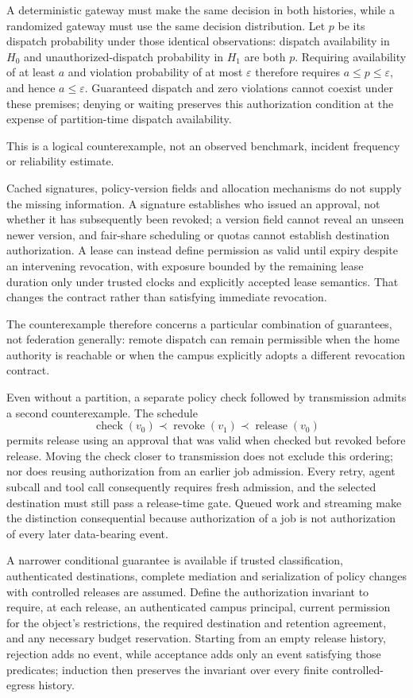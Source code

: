 \documentclass[11pt]{article}
\begin{document}
A deterministic gateway must make the same decision in both histories, while a randomized gateway must use the same decision distribution. Let $p$ be its dispatch probability under those identical observations: dispatch availability in $H_0$ and unauthorized-dispatch probability in $H_1$ are both $p$. Requiring availability of at least $a$ and violation probability of at most $\varepsilon$ therefore requires $a \leq p \leq \varepsilon$, and hence $a \leq \varepsilon$. Guaranteed dispatch and zero violations cannot coexist under these premises; denying or waiting preserves this authorization condition at the expense of partition-time dispatch availability.

This is a logical counterexample, not an observed benchmark, incident frequency or reliability estimate.

Cached signatures, policy-version fields and allocation mechanisms do not supply the missing information. A signature establishes who issued an approval, not whether it has subsequently been revoked; a version field cannot reveal an unseen newer version, and fair-share scheduling or quotas cannot establish destination authorization. A lease can instead define permission as valid until expiry despite an intervening revocation, with exposure bounded by the remaining lease duration only under trusted clocks and explicitly accepted lease semantics. That changes the contract rather than satisfying immediate revocation.

The counterexample therefore concerns a particular combination of guarantees, not federation generally: remote dispatch can remain permissible when the home authority is reachable or when the campus explicitly adopts a different revocation contract.

Even without a partition, a separate policy check followed by transmission admits a second counterexample. The schedule \[\operatorname{check}(v_0) \prec \operatorname{revoke}(v_1) \prec \operatorname{release}(v_0)\] permits release using an approval that was valid when checked but revoked before release. Moving the check closer to transmission does not exclude this ordering; nor does reusing authorization from an earlier job admission. Every retry, agent subcall and tool call consequently requires fresh admission, and the selected destination must still pass a release-time gate. Queued work and streaming make the distinction consequential because authorization of a job is not authorization of every later data-bearing event.

A narrower conditional guarantee is available if trusted classification, authenticated destinations, complete mediation and serialization of policy changes with controlled releases are assumed. Define the authorization invariant to require, at each release, an authenticated campus principal, current permission for the object's restrictions, the required destination and retention agreement, and any necessary budget reservation. Starting from an empty release history, rejection adds no event, while acceptance adds only an event satisfying those predicates; induction then preserves the invariant over every finite controlled-egress history.
\end{document}
